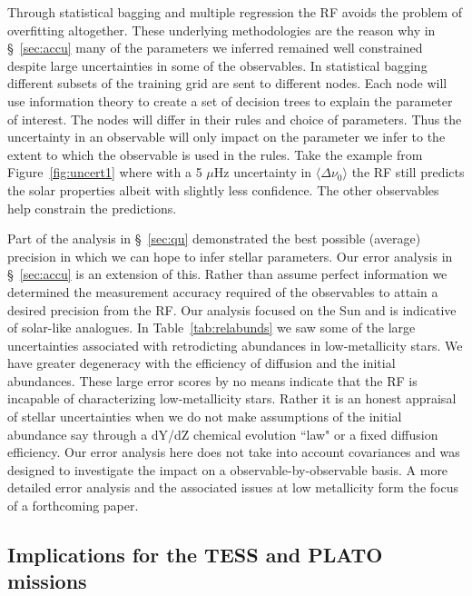 Through statistical bagging and multiple regression the RF avoids the problem of overfitting altogether. 
These underlying methodologies are the reason why in \S~\ref{sec:accu} many of the parameters we inferred remained well constrained despite large uncertainties in some of the observables.   
In statistical bagging different subsets of the training grid are sent to different nodes. Each node will use information theory to create a set of decision trees to explain the parameter of interest. The nodes will differ in their rules and choice of parameters. Thus the uncertainty in an observable will only impact on the parameter we infer to the extent to which the observable is used in the rules.  
Take the example from Figure~\ref{fig:uncert1} where with a 5 $\mu$Hz uncertainty in $\langle\Delta\nu_0\rangle$ the RF still predicts the solar properties albeit with slightly less confidence.
The other observables help constrain the predictions. 

Part of the analysis in \S~\ref{sec:qu} demonstrated the best possible (average) precision in which we can hope to infer stellar parameters. Our error analysis in \S~\ref{sec:accu} is an extension of this. Rather than assume perfect information we determined  
 the measurement accuracy required of the observables to attain a desired precision from the RF.
Our analysis focused on the Sun and is indicative of solar-like analogues.
In Table~\ref{tab:relabunds} we saw some of the large uncertainties associated with retrodicting abundances in low-metallicity stars. We have greater degeneracy with the efficiency of diffusion and the initial abundances. These large error scores by no means indicate that the RF is incapable of characterizing low-metallicity stars. Rather it is an honest appraisal of stellar uncertainties when we do not make assumptions of the initial abundance say through a dY/dZ  chemical evolution ``law"  or a fixed diffusion efficiency. Our error analysis here does not take into account covariances and was designed to investigate the impact on a observable-by-observable basis.
A more detailed error analysis and the associated issues at low metallicity form the focus of a forthcoming paper.  


\subsection{Implications for the TESS and PLATO missions}

